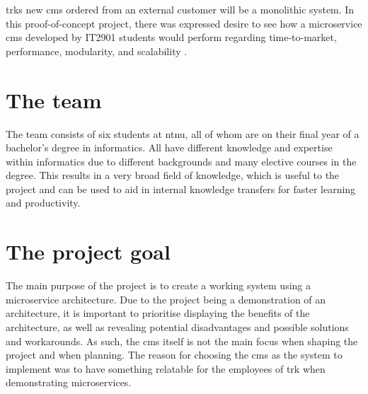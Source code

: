 \acrshort{trk}s new \acrshort{cms} ordered from an external customer will be a monolithic system. In this proof-of-concept project, there was expressed desire to see how a microservice \acrshort{cms} developed by IT2901 students would perform regarding time-to-market, performance, modularity, and scalability \citep{trkInfo}.

\section{The team}
The team consists of six students at \acrshort{ntnu}, all of whom are on their final year of a bachelor's degree in informatics. All have different knowledge and expertise within informatics due to different backgrounds and many elective courses in the degree. This results in a very broad field of knowledge, which is useful to the project and can be used to aid in internal knowledge transfers for faster learning and productivity. 


\section{The project goal}
The main purpose of the project is to create a working system using a microservice architecture. Due to the project being a demonstration of an architecture, it is important to prioritise displaying the benefits of the architecture, as well as revealing potential disadvantages and possible solutions and workarounds.
As such, the \acrshort{cms} itself is not the main focus when shaping the project and when planning. The reason for choosing the \acrshort{cms} as the system to implement was to have something relatable for the employees of \acrshort{trk} when demonstrating microservices. 
